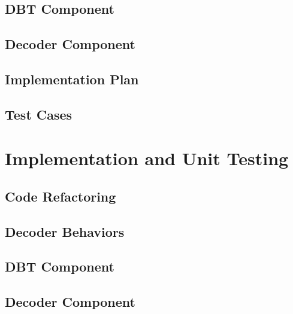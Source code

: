 \documentclass[12pt]{article}
\begin{document}
\subsection{DBT Component}


\subsection{Decoder Component}


\subsection{Implementation Plan}


\subsection{Test Cases}


\newpage
\section{Implementation and Unit Testing}


\subsection{Code Refactoring}


\subsection{Decoder Behaviors}


\subsection {DBT Component}

\subsection{Decoder Component}


\newpage
\end{document}
